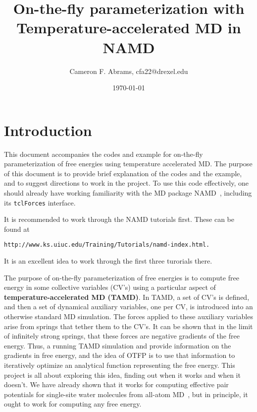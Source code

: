 \documentclass[11pt]{article}
\begin{document}
\title{On-the-fly parameterization with Temperature-accelerated MD in NAMD}
\author{Cameron F. Abrams, cfa22@drexel.edu}
\date{\today}

\maketitle

\section{Introduction}

This document accompanies the codes and example for on-the-fly
parameterization of free energies using temperature accelerated MD.
The purpose of this document is to provide brief explanation of the
codes and the example, and to suggest directions to work in the
project.  To use this code effectively, one should already have
working familiarity with the MD package NAMD~\cite{Phillips2005},
including its {\tt tclForces} interface.

It is recommended to work through the NAMD tutorials first.  These can
be found at 

\begin{verbatim}
http://www.ks.uiuc.edu/Training/Tutorials/namd-index.html.
\end{verbatim}

It is an excellent idea to work through the first three turorials
there.

The purpose of on-the-fly parameterization of free energies is to
compute free energy in some collective variables (CV's) using a
particular aspect of {\bf temperature-accelerated MD (TAMD)}.  In
TAMD, a set of CV's is defined, and then a set of dynamical auxiliary
variables, one per CV, is introduced into an otherwise standard MD
simulation.  The forces applied to these auxiliary variables arise
from springs that tether them to the CV's.  It can be shown that in
the limit of infinitely strong springs, that these forces are negative
gradients of the free energy.  Thus, a running TAMD simulation and
provide information on the gradients in free energy, and the idea of
OTFP is to use that information to iteratively optimize an analytical
function representing the free energy.  This project is all about
exploring this idea, finding out when it works and when it doesn't.
We have already shown that it works for computing effective pair
potentials for single-site water molecules from all-atom
MD~\cite{Abrams2012}, but in principle, it ought to work for computing
any free energy.
\end{document}
